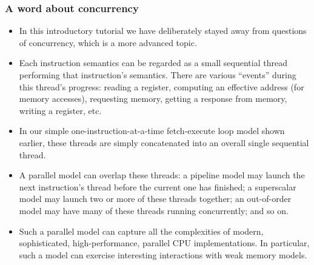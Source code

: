 \documentclass[aspectratio=169]{beamer}
\newcommand{\slidefont}{\scriptsize}
\begin{document}
\begin{frame}[fragile]
  \frametitle{A word about concurrency}

  \slidefont

  \begin{itemize}

  \item
    In this introductory tutorial we have deliberately stayed away
    from questions of concurrency, which is a more advanced topic.

  \item
    Each instruction semantics can be regarded as a small sequential
    thread performing that instruction's semantics.  There are various
    ``events'' during this thread's progress: reading a register,
    computing an effective address (for memory accesses), requesting
    memory, getting a response from memory, writing a register, etc.

  \item
    In our simple one-instruction-at-a-time fetch-execute loop model
    shown earlier, these threads are simply concatenated into an
    overall single sequential thread.

  \item
    A parallel model can overlap these threads: a pipeline model may
    launch the next instruction's thread before the current one has
    finished; a superscalar model may launch two or more of these
    threads together; an out-of-order model may have many of these
    threads running concurrently; and so on.

  \item
    Such a parallel model can capture all the complexities of modern,
    sophisticated, high-performance, parallel CPU implementations. In
    particular, such a model can exercise interesting interactions
    with weak memory models.

  \end{itemize}

\end{frame}

\end{document}
